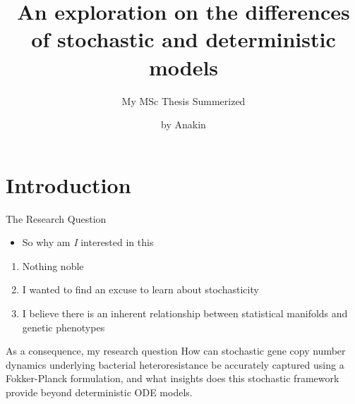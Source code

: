\documentclass[aspectratio=169,  notheorems, sOuRcEs]{RUCPresentation}
\title{%
    An exploration on the differences of stochastic and
    deterministic models
}
\subtitle{  My MSc Thesis Summerized }
\author{by Anakin}
\newcommand\makebeamertitle{\frame{\maketitle}}%
\begin{document}
\makebeamertitle


\section{Introduction}

\begin{frame}{The Research Question}

    \begin{itemize}
        \item So why am \emph{I} interested in this
    \end{itemize}
    \pause
    \begin{enumerate}[<+->]
        \item Nothing noble
        \item I wanted to find an excuse to learn about stochasticity
        \item I believe there is an inherent relationship between
            statistical manifolds and genetic phenotypes
    \end{enumerate}

    \pause
    \begin{block}{As a consequence, my research question}
        How can stochastic gene copy number dynamics underlying bacterial
        heteroresistance be accurately captured using a Fokker-Planck formulation,
        and what insights does this stochastic framework provide beyond deterministic ODE models.
    \end{block}

\end{frame}

\end{document}
